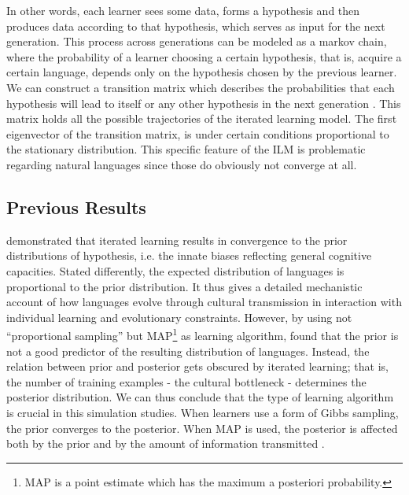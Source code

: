 \documentclass[12pt]{scrartcl}
\begin{document}
In other words, each learner sees some data, forms a hypothesis and then produces data according to that hypothesis, which serves as input for the next generation. This process across generations can be modeled as a markov chain, where the probability of a learner choosing a certain hypothesis, that is, acquire a certain language, depends only on the hypothesis chosen by the previous learner. We can construct a transition matrix which %
describes the probabilities that each hypothesis will lead to itself or any other hypothesis in the next generation \parencite{ferdinand2008language}. This matrix holds all the possible trajectories of the iterated learning model. 
The first eigenvector of the transition matrix, is under certain conditions proportional to the stationary distribution. 
This specific feature of the ILM is problematic regarding natural languages since those do obviously not converge at all.

\subsection*{Previous Results}
\textcite{griffiths2005bayesian} demonstrated that iterated learning results in convergence to the prior distributions of hypothesis, i.e. the innate biases reflecting general cognitive capacities. Stated differently, the expected distribution of languages is proportional to the prior distribution.
It thus gives a detailed mechanistic account of how languages evolve through cultural transmission in interaction with individual learning and evolutionary constraints.
However, by using not ``proportional sampling'' but MAP\footnote{MAP is a point estimate which has the maximum a posteriori probability.} as learning algorithm, \textcite{kirby2007innateness} found that the prior is not a good predictor of the resulting distribution of languages. Instead, the relation between prior and posterior gets obscured by iterated learning; that is, the number of training examples - the cultural bottleneck - determines the posterior distribution. We can thus conclude that the type of learning algorithm is crucial in this simulation studies. When learners use a form of Gibbs sampling, the prior converges to the posterior. When MAP is used, the posterior is affected both by the prior and by the amount of information transmitted \parencite{griffiths2007language}.\\
\end{document}
